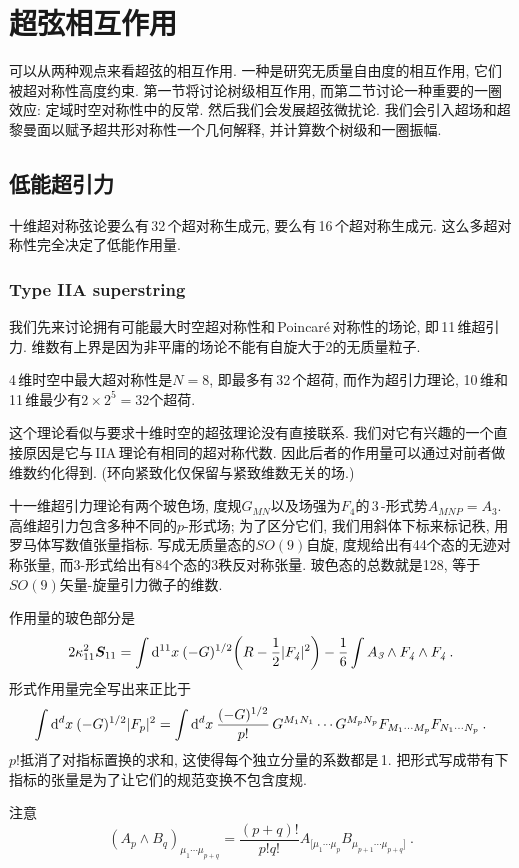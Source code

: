 
\chapter{超弦相互作用}

可以从两种观点来看超弦的相互作用. 一种是研究无质量自由度的相互作用, 它们被超对称性高度约束. 第一节将讨论树级相互作用, 而第二节讨论一种重要的一圈效应: 定域时空对称性中的反常. 然后我们会发展超弦微扰论. 我们会引入超场和超黎曼面以赋予超共形对称性一个几何解释, 并计算数个树级和一圈振幅.



\section{低能超引力}

十维超对称弦论要么有\,32\,个超对称生成元, 要么有\,16\,个超对称生成元. 这么多超对称性完全决定了低能作用量.

\subsection*{Type IIA superstring}

我们先来讨论拥有可能最大时空超对称性和\,Poincar\'{e}\,对称性的场论, 即\,11\,维超引力. 维数有上界是因为非平庸的场论不能有自旋大于2的无质量粒子.

\begin{tcolorbox}
    4\,维时空中最大超对称性是$ N=8$, 即最多有\,32\,个超荷, 而作为超引力理论, 10\,维和11\,维最少有$ 2\times 2^{5}=32 $个超荷.
\end{tcolorbox}

这个理论看似与要求十维时空的超弦理论没有直接联系. 我们对它有兴趣的一个直接原因是它与\,IIA\,理论有相同的超对称代数. 因此后者的作用量可以通过对前者做维数约化得到. (环向紧致化仅保留与紧致维数无关的场.)

十一维超引力理论有两个玻色场, 度规$ G_{MN}$以及场强为$ F_{\textit{4}} $的\,3\,-形式势$ A_{MNP}=A_{\textit{3}}$. 高维超引力包含多种不同的$ p $-形式场; 为了区分它们, 我们用斜体下标来标记秩, 用罗马体写数值张量指标. 写成无质量态的$ SO(9) $自旋, 度规给出有44个态的无迹对称张量, 而3-形式给出有84个态的3秩反对称张量. 玻色态的总数就是128, 等于$ SO(9) $矢量-旋量引力微子的维数.

作用量的玻色部分是
\begin{equation}
    2\kappa_{11}^{2}\bm{S}_{11}=\int\mathrm{d}^{11}x\:(-G)^{1/2}\biggl(R-\frac{1}{2}\lvert F_{\textit{4}}\rvert^{2}\biggr)-\frac{1}{6}\int A_{\textit{3}}\wedge F_{\textit{4}}\wedge F_{\textit{4}} \:. \label{12.1.1}
\end{equation}
形式作用量完全写出来正比于
\begin{equation}
    \int\mathrm{d}^{d}x\:(-G)^{1/2}\lvert F_{p}\rvert^{2} = \int \mathrm{d}^{d}x\:\frac{(-G)^{1/2}}{p!}\,G^{M_{1}N_{1}}\cdots G^{M_{p}N_{p}}F_{M_{1}\cdots M_{p}}F_{N_{1}\cdots N_{p}} \:. \label{12.1.2}
\end{equation}
$p! $抵消了对指标置换的求和, 这使得每个独立分量的系数都是\,1.  把形式写成带有下指标的张量是为了让它们的规范变换不包含度规.
\begin{tcolorbox}
    注意
    \[(A_{p}\wedge B_{q})_{\mu_{1}\cdots\mu_{p+q}} = \frac{(p+q)!}{p!q!}A_{[\mu_{1}\cdots \mu_{p}}B_{\mu_{p+1}\cdots\mu_{p+q}]} \:.\]
\end{tcolorbox}

